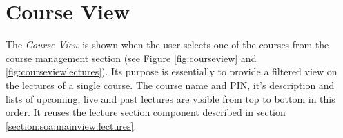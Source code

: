 \section{Course View}
\label{section:soa:courseview}

The \emph{Course View} is shown when the user selects one of the courses from the course management section (see Figure \ref{fig:courseview} and \ref{fig:courseviewlectures}). Its purpose is essentially to provide a filtered view on the lectures of a single course.
The course name and PIN, it's description and lists of upcoming, live and past lectures are visible from top to bottom in this order. It reuses the lecture section component described in section \ref{section:soa:mainview:lectures}.

\begin{figure}
	\centering
	\begin{minipage}[t]{.5\textwidth}
		\centering

\end{minipage}
\end{figure}
